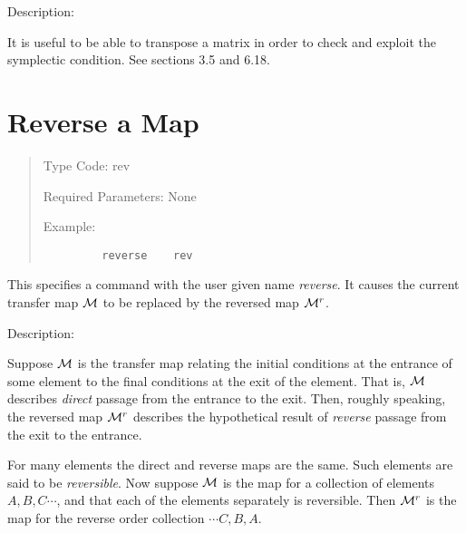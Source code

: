 \vspace{5mm}
     Description:
\vspace{2mm}

         It is useful to be able to transpose a matrix in order to check
and exploit the symplectic condition.  See sections 3.5 and 6.18.

\newpage
\section{Reverse a Map}
\begin{quotation}
\noindent Type Code:  rev
\vspace{5mm}

\noindent Required Parameters:  None

\vspace{5mm}
\noindent Example:
\begin{verbatim}
         reverse    rev
\end{verbatim}
\end{quotation}
This specifies a command with the user given name {\em reverse}.  It causes the
current transfer map ${\cal M}$ to be replaced by the reversed map ${\cal M}^r$.

\vspace{5mm}
     Description:
\vspace{2mm}

	Suppose ${\cal M}$ is the transfer map relating the initial conditions at
the entrance of some element to the final conditions at the exit of the
element.  That is, ${\cal M}$ describes {\em direct} passage from the
entrance to the exit.  Then, roughly speaking, the reversed map ${\cal
M}^r$ describes the hypothetical result of {\em reverse} passage from the
exit to the entrance.

	For many elements the direct and reverse maps are the same.  Such
elements are said to be {\em reversible}.  Now suppose ${\cal M}$ is the
map for a collection of elements $A, B, C \cdots$, and that each of the
elements separately is reversible.  Then ${\cal M}^r$ is the map for the
reverse order collection $\cdots C, B, A$.

\newpage
